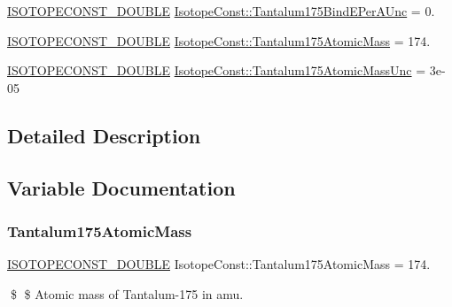 \begin{DoxyCompactItemize}
\mbox{\hyperlink{group___isotope_const-_macros_ga8f45a7272ce02c0b4c65c44636ed719a}{I\+S\+O\+T\+O\+P\+E\+C\+O\+N\+S\+T\+\_\+\+D\+O\+U\+B\+LE}} \mbox{\hyperlink{group___isotope_const-_tantalum-_ta175_ga2fa746a2b1d5850c76c090640f710dae}{Isotope\+Const\+::\+Tantalum175\+Bind\+E\+Per\+A\+Unc}} = 0.
\item 
\mbox{\hyperlink{group___isotope_const-_macros_ga8f45a7272ce02c0b4c65c44636ed719a}{I\+S\+O\+T\+O\+P\+E\+C\+O\+N\+S\+T\+\_\+\+D\+O\+U\+B\+LE}} \mbox{\hyperlink{group___isotope_const-_tantalum-_ta175_gab804b955bce26a20b78a4c143c81e7bd}{Isotope\+Const\+::\+Tantalum175\+Atomic\+Mass}} = 174.
\item 
\mbox{\hyperlink{group___isotope_const-_macros_ga8f45a7272ce02c0b4c65c44636ed719a}{I\+S\+O\+T\+O\+P\+E\+C\+O\+N\+S\+T\+\_\+\+D\+O\+U\+B\+LE}} \mbox{\hyperlink{group___isotope_const-_tantalum-_ta175_ga9d212d977966d566520ce467d3838e5c}{Isotope\+Const\+::\+Tantalum175\+Atomic\+Mass\+Unc}} = 3e-\/05
\end{DoxyCompactItemize}


\subsection{Detailed Description}


\subsection{Variable Documentation}
\mbox{\label{group___isotope_const-_tantalum-_ta175_gab804b955bce26a20b78a4c143c81e7bd}} 
\subsubsection{\texorpdfstring{Tantalum175\+Atomic\+Mass}{Tantalum175AtomicMass}}
{\footnotesize\ttfamily \mbox{\hyperlink{group___isotope_const-_macros_ga8f45a7272ce02c0b4c65c44636ed719a}{I\+S\+O\+T\+O\+P\+E\+C\+O\+N\+S\+T\+\_\+\+D\+O\+U\+B\+LE}} Isotope\+Const\+::\+Tantalum175\+Atomic\+Mass = 174.}

\$ \$ Atomic mass of Tantalum-\/175 in amu. \mbox{\label{group___isotope_const-_tantalum-_ta175_ga9d212d977966d566520ce467d3838e5c}} 
